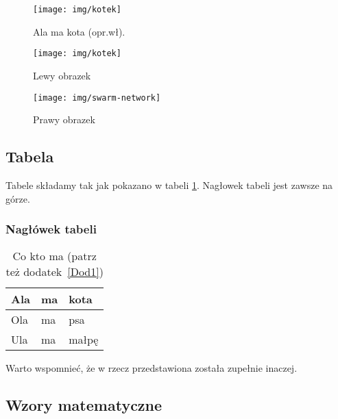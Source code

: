 \begin{figure}[h]
\centering\texttt{[image: img/kotek]}
\caption{Ala ma kota (opr.wł).}\label{rysunek:kot}
\end{figure}

\lipsum[11-12]

\begin{figure}[h] 
	\centering
	\begin{minipage}[b]{0.45\textwidth}
		\centering\texttt{[image: img/kotek]} %
		\caption{Lewy obrazek}\label{rysunek:lewy}
	\end{minipage}
	\begin{minipage}[b]{0.45\textwidth}
		\centering
		\texttt{[image: img/swarm-network]} %
		\caption{Prawy obrazek}\label{rysunek:prawy}
	\end{minipage}
\end{figure}

\lipsum[13-14]


\subsection{Tabela}

Tabele składamy tak jak pokazano w tabeli \ref{tabela:coktoma}. Nagłowek tabeli jest zawsze na górze. \lipsum[15] 

\subsubsection{Nagłówek tabeli}

\begin{table}
\centering\caption{Co kto ma \cite{harel_rzecz_2008} (patrz też dodatek~\ref{Dod1}) \label{tabela:coktoma}}
\begin{tabular}{|l|l|l|}%
\hline
Ala & ma & kota \\
\hline
Ola & ma & psa \\
\hline
Ula & ma & małpę\\
\hline
\end{tabular}
\end{table}

\lipsum[19-20] Warto wspomnieć, że w \cite{aizawa_groundwater_2009} rzecz przedstawiona została zupełnie inaczej. 


\subsection{Wzory matematyczne}

